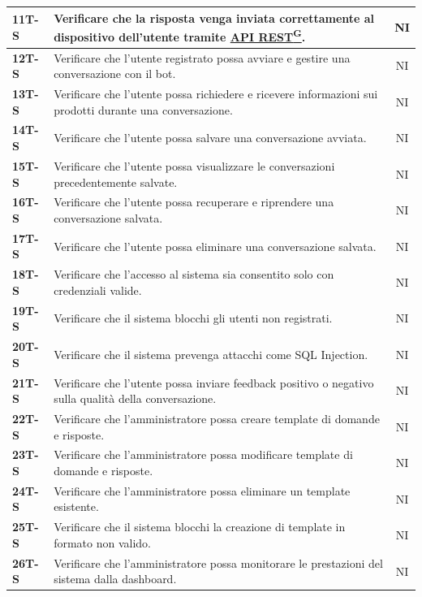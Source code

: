 \documentclass{article}
\begin{document}
\begin{longtable}{|>{\centering\arraybackslash}m{}|>{\raggedright\arraybackslash}m{}|c|}
    \hline
    \textbf{11T-S} & Verificare che la risposta venga inviata correttamente al dispositivo dell’utente tramite \href{https://code7crusaders.github.io/docs/RTB/documentazione_interna/glossario.html#api-rest-representational-state-transfer}{API REST\textsuperscript{G}}. & NI \\
    \hline
    \textbf{12T-S} & Verificare che l’utente registrato possa avviare e gestire una conversazione con il bot. & NI \\
    \hline
    \textbf{13T-S} & Verificare che l’utente possa richiedere e ricevere informazioni sui prodotti durante una conversazione. & NI \\
    \hline
    \textbf{14T-S} & Verificare che l’utente possa salvare una conversazione avviata. & NI \\
    \hline
    \textbf{15T-S} & Verificare che l’utente possa visualizzare le conversazioni precedentemente salvate. & NI \\
    \hline
    \textbf{16T-S} & Verificare che l’utente possa recuperare e riprendere una conversazione salvata. & NI \\
    \hline
    \textbf{17T-S} & Verificare che l’utente possa eliminare una conversazione salvata. & NI \\
    \hline
    \textbf{18T-S} & Verificare che l’accesso al sistema sia consentito solo con credenziali valide. & NI \\
    \hline
    \textbf{19T-S} & Verificare che il sistema blocchi gli utenti non registrati. & NI \\
    \hline
    \textbf{20T-S} & Verificare che il sistema prevenga attacchi come SQL Injection. & NI \\
    \hline
    \textbf{21T-S} & Verificare che l’utente possa inviare feedback positivo o negativo sulla qualità della conversazione. & NI \\
    \hline
    \textbf{22T-S} & Verificare che l’amministratore possa creare template di domande e risposte. & NI \\
    \hline
    \textbf{23T-S} & Verificare che l’amministratore possa modificare template di domande e risposte. & NI \\
    \hline
    \textbf{24T-S} & Verificare che l’amministratore possa eliminare un template esistente. & NI \\
    \hline
    \textbf{25T-S} & Verificare che il sistema blocchi la creazione di template in formato non valido. & NI \\
    \hline
    \textbf{26T-S} & Verificare che l’amministratore possa monitorare le prestazioni del sistema dalla dashboard. & NI \\

\end{longtable}
\end{document}

